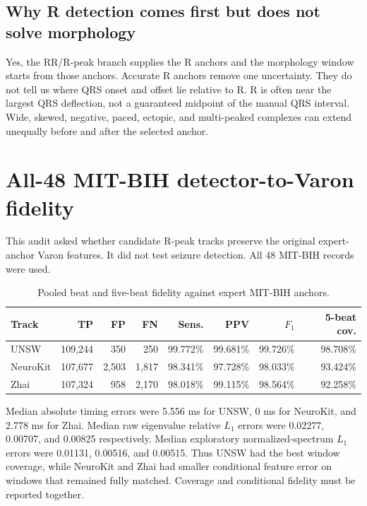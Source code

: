 \documentclass[11pt,a4paper]{article}
\begin{document}
\subsection{Why R detection comes first but does not solve morphology}

Yes, the RR/R-peak branch supplies the R anchors and the morphology window starts from those anchors. Accurate R anchors remove one uncertainty. They do not tell us where QRS onset and offset lie relative to R. R is often near the largest QRS deflection, not a guaranteed midpoint of the manual QRS interval. Wide, skewed, negative, paced, ectopic, and multi-peaked complexes can extend unequally before and after the selected anchor.

\section{All-48 MIT-BIH detector-to-Varon fidelity}
\label{sec:mitfidelity}

This audit asked whether candidate R-peak tracks preserve the original expert-anchor Varon features. It did not test seizure detection. All 48 MIT-BIH records were used.

\begin{table}[H]
\centering
\small
\caption{Pooled beat and five-beat fidelity against expert MIT-BIH anchors.}
\begin{tabular}{lrrrrrrr}
\toprule
Track & TP & FP & FN & Sens. & PPV & $F_1$ & 5-beat cov. \\
\midrule
UNSW & 109,244 & 350 & 250 & 99.772\% & 99.681\% & 99.726\% & 98.708\% \\
NeuroKit & 107,677 & 2,503 & 1,817 & 98.341\% & 97.728\% & 98.033\% & 93.424\% \\
Zhai & 107,324 & 958 & 2,170 & 98.018\% & 99.115\% & 98.564\% & 92.258\% \\
\bottomrule
\end{tabular}
\end{table}

Median absolute timing errors were 5.556 ms for UNSW, 0 ms for NeuroKit, and 2.778 ms for Zhai. Median raw eigenvalue relative $L_1$ errors were 0.02277, 0.00707, and 0.00825 respectively. Median exploratory normalized-spectrum $L_1$ errors were 0.01131, 0.00516, and 0.00515. Thus UNSW had the best window coverage, while NeuroKit and Zhai had smaller conditional feature error on windows that remained fully matched. Coverage and conditional fidelity must be reported together.
\end{document}

